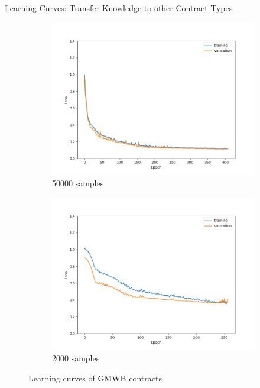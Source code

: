 \documentclass[9pt,handout]{beamer}
\begin{document}
    

    
    \begin{frame}{Learning Curves: Transfer Knowledge to other Contract Types}
    \begin{figure}[ht]
        \centering
        \begin{subfigure}{0.48\textwidth}
            \includegraphics[width=\textwidth]{../project3/figures/figure4a.png}
            \caption{50000 samples}
        \end{subfigure}
        \begin{subfigure}{0.48\textwidth}
            \includegraphics[width=\textwidth]{../project3/figures/figure4b.png}
            \caption{2000 samples}
        \end{subfigure}
        \caption{Learning curves of GMWB contracts}
    \end{figure}
    

\end{frame}
\end{document}
